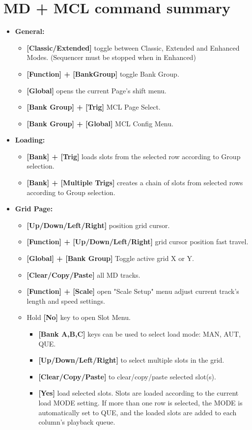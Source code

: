\section{MD + MCL command summary}
\begin{itemize}
\item \textbf{General:}
   \begin{itemize}
      \item \textbf{[Classic/Extended] } toggle between Classic, Extended and Enhanced Modes. (Sequencer must be stopped when in Enhanced)
      \item \textbf{[Function] + [BankGroup]} toggle Bank Group.
      \item \textbf{[Global]} opens the current Page's shift menu.
      \item \textbf{[Bank Group] + [Trig]} MCL Page Select.
      \item \textbf{[Bank Group] + [Global]} MCL Config Menu. 
 \end{itemize}
 
\item \textbf{Loading:}
   \begin{itemize}
      \item \textbf{[Bank] + [Trig]} loads slots from the selected row according to Group selection.
      \item \textbf{[Bank] + [Multiple Trigs]} creates a chain of slots from selected rows according to Group selection.
   \end{itemize}

\item \textbf{Grid Page:}
    \begin{itemize}
      \item \textbf{[Up/Down/Left/Right]} position grid cursor.
      \item \textbf{[Function] + [Up/Down/Left/Right]} grid cursor position fast travel.
      \item \textbf{[Global] + [Bank Group]} Toggle active grid X or Y. 
      \item \textbf{[Clear/Copy/Paste]} all MD tracks.
      \item \textbf{[Function] + [Scale]} open "Scale Setup" menu adjust current track's length and speed settings.
      \item Hold \textbf{[No]} key to open Slot Menu.
      \begin{itemize}
                \item \textbf{[Bank A,B,C]} keys can be used to select load mode: MAN, AUT, QUE.
                \item \textbf{[Up/Down/Left/Right]} to select multiple slots in the grid.
                \item \textbf{[Clear/Copy/Paste]} to clear/copy/paste selected slot(s).
                \item \textbf{[Yes]} load selected slots. Slots are loaded according to the current load MODE setting. If more than one row is selected, the MODE is automatically set to QUE, and the loaded slots are added to each column's playback queue.                
      \end{itemize}


\end{itemize}
\end{itemize}
